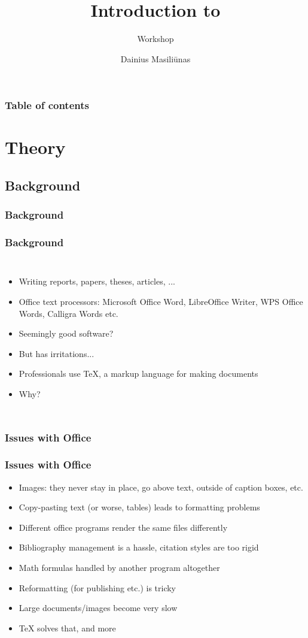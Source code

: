 \documentclass[xetex,colorlinks]{beamer} %
\title{Introduction to \hologo{LaTeXTeX}}
\subtitle{Workshop}
\author{Dainius Masiliūnas} %
\institute{Master Geo-Information Science\\ Wageningen University \& Research}
\begin{document}
  \begin{frame}
    \titlepage
  \end{frame}

  \begin{frame}
    \frametitle{Table of contents}
    \tableofcontents
  \end{frame}

  \section{Theory}
  \subsection{Background}
  \subsubsection{Background}
  \begin{frame}
    \frametitle{Background}
    \begin{columns}
      \begin{itemize}
	\item Writing reports, papers, theses, articles, ...
	\item Office text processors: Microsoft Office Word, LibreOffice Writer, WPS Office Words, Calligra Words etc.
	\item Seemingly good software?
	\item But has irritations...
	\item Professionals use \TeX{}, a markup language for making documents
	\item Why?
      \end{itemize}
      
    \end{columns}
  \end{frame}
  
  \subsubsection{Issues with Office}
  \begin{frame}
    \frametitle{Issues with Office}
    \begin{itemize}
     \item Images: they never stay in place, go above text, outside of caption boxes, etc.
     \item Copy-pasting text (or worse, tables) leads to formatting problems
     \item Different office programs render the same files differently
     \item Bibliography management is a hassle, citation styles are too rigid
     \item Math formulas handled by another program altogether
     \item Reformatting (for publishing etc.) is tricky
     \item Large documents/images become very slow
     \item \TeX{} solves that, and more
    \end{itemize}
  \end{frame}
  
\end{document}
